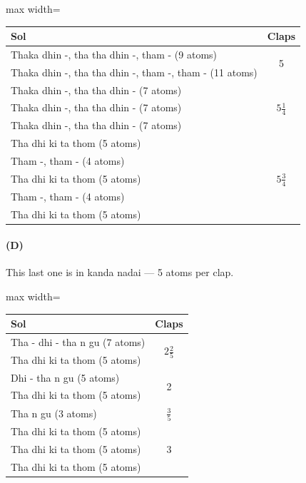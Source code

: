 \begin{center}
\begin{adjustbox}{max width=\textwidth}
\begin{tabular}{l c}
\toprule
Sol & Claps\\
\midrule
Thaka dhin -, tha tha dhin -, tham - (9 atoms)         & \multirow{2}{*}{5}\\
Thaka dhin -, tha tha dhin -, tham -, tham - (11 atoms) & \\
\midrule
Thaka dhin -, tha tha dhin - (7 atoms) & \multirow{3}{*}{$5\frac{1}{4}$}\\
Thaka dhin -, tha tha dhin - (7 atoms) & \\
Thaka dhin -, tha tha dhin - (7 atoms) & \\
\midrule
Tha dhi ki ta thom (5 atoms) & \multirow{5}{*}{$5\frac{3}{4}$}\\
Tham -, tham - (4 atoms)      & \\
Tha dhi ki ta thom (5 atoms) & \\
Tham -, tham - (4 atoms)      & \\
Tha dhi ki ta thom (5 atoms) & \\
\bottomrule
\end{tabular}
\end{adjustbox}
\end{center}

\paragraph{(D)}
This last one is in kanda nadai --- 5 atoms per clap.

\begin{center}
\begin{adjustbox}{max width=\textwidth}
\begin{tabular}{l c}
\toprule
Sol & Claps\\
\midrule
Tha - dhi - tha n gu (7 atoms) & \multirow{2}{*}{$2\frac{2}{5}$}\\
Tha dhi ki ta thom (5 atoms)   & \\
\midrule
Dhi - tha n gu (5 atoms)     & \multirow{2}{*}{2}\\
Tha dhi ki ta thom (5 atoms) & \\
\midrule
Tha n gu (3 atoms) & $\frac{3}{5}$\\
\midrule
Tha dhi ki ta thom (5 atoms) & \multirow{3}{*}{3}\\
Tha dhi ki ta thom (5 atoms) & \\
Tha dhi ki ta thom (5 atoms) & \\
\bottomrule
\end{tabular}
\end{adjustbox}
\end{center}
